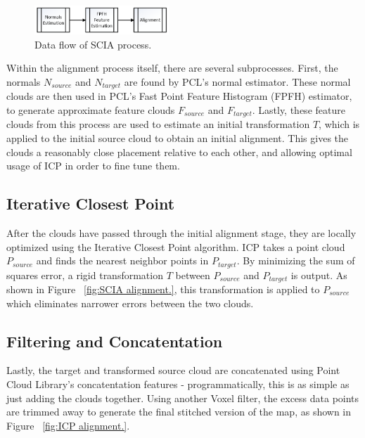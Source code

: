 \documentclass[letterpaper, oneside, 10pt]{report}
\begin{document}
    \begin{figure}[h]
     \caption{Data flow of SCIA process.}
     \centering
       \includegraphics[width=0.45\textwidth]{images/initialalignment}
    \end{figure}

    \noindent Within the alignment process itself, there are several subprocesses. First, the normals $N_{source}$ and $N_{target}$ are found by PCL's normal estimator. These normal clouds are then used in PCL's Fast Point Feature Histogram (FPFH) \cite{rusu2009fast,rusu2009fastlabel} estimator, to generate approximate feature clouds $F_{source}$ and $F_{target}$. Lastly, these feature clouds from this process are used to estimate an initial transformation $T$, which is applied to the initial source cloud to obtain an initial alignment. This gives the clouds a reasonably close placement relative to each other, and allowing optimal usage of ICP in order to fine tune them.

    \subsection{Iterative Closest Point}

    \noindent After the clouds have passed through the initial alignment stage, they are locally optimized using the Iterative Closest Point algorithm. ICP takes a point cloud $P_{source}$ and finds the nearest neighbor points in $P_{target}$. By minimizing the sum of squares error, a rigid transformation $T$ between $P_{source}$ and $P_{target}$ is output. As shown in Figure ~\ref{fig:SCIA alignment.}, this transformation is applied to $P_{source}$ which eliminates narrower errors between the two clouds.

    \subsection{Filtering and Concatentation}

    Lastly, the target and transformed source cloud are concatenated using Point Cloud Library's concatentation features - programmatically, this is as simple as just adding the clouds together. Using another Voxel filter, the excess data points are trimmed away to generate the final stitched version of the map, as shown in Figure ~\ref{fig:ICP alignment.}. \\
\end{document}
